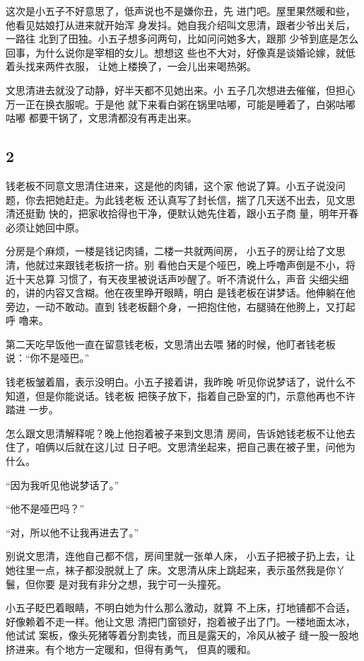 这次是小五子不好意思了，低声说也不是嫌你丑，先
进门吧。屋里果然暖和些，他看见姑娘打从进来就开始浑
身发抖。她自我介绍叫文思清，跟者少爷出关后，一路往
北到了田独。小五子想多问两句，比如问问她多大，跟那
少爷到底是怎么回事，为什么说你是宰相的女儿。想想这
些也不大对，好像真是谈婚论嫁，就低着头找来两件衣服，
让她上楼换了，一会儿出来喝热粥。

文思清进去就没了动静，好半天都不见她出来。小
五子几次想进去催催，但担心万一正在换衣服呢。于是他
就下来看白粥在锅里咕嘟，可能是睡着了，白粥咕嘟咕嘟
都要干锅了，文思清都没有再走出来。
\newline

{\centering\subsection{2}}

钱老板不同意文思清住进来，这是他的肉铺，这个家
他说了算。小五子说没问题，你去把她赶走。为此钱老板
还认真写了封长信，揣了几天送不出去，见文思清还挺勤
快的，把家收拾得也干净，便默认她先住着，跟小五子商
量，明年开春必须让她回中原。

分房是个麻烦，一楼是钱记肉铺，二楼一共就两间房，
小五子的房让给了文思清，他就过来跟钱老板挤一挤。别
看他白天是个哑巴，晚上呼噜声倒是不小，将近十天总算
习惯了，有天夜里被说话声吵醒了。听不清说什么，声音
尖细尖细的，讲的内容又含糊。他在夜里睁开眼睛，明白
是钱老板在讲梦话。他伸躺在他旁边，一动不敢动。直到
钱老板翻个身，一把抱住他，右腿骑在他胯上，又打起呼
噜来。

第二天吃早饭他一直在留意钱老板，文思清出去喂
猪的时候，他盯者钱老板说：“你不是哑巴。”

钱老板皱着眉，表示没明白。小五子接着讲，我昨晚
听见你说梦话了，说什么不知道，但是你能说话。钱老板
把筷子放下，指着自己卧室的门，示意他再也不许踏进
一步。

怎么跟文思清解释呢？晚上他抱着被子来到文思清
房间，告诉她钱老板不让他去住了，咱俩以后就在这儿过
日子吧。文思清坐起来，把自己裹在被子里，问他为什么。

“因为我听见他说梦话了。”

“他不是哑巴吗？”

“对，所以他不让我再进去了。”

别说文思清，连他自己都不信，房间里就一张单人床，
小五子把被子扔上去，让她往里一点，袜子都没脱就上了
床。文思清从床上跳起来，表示虽然我是你丫鬟，但你要
是对我有非分之想，我宁可一头撞死。

小五子眨巴着眼睛，不明白她为什么那么激动，就算
不上床，打地铺都不合适，好像赖着不走一样。他让文思
清把门窗锁好，抱着被子出了门。一楼地面太冰，他试试
案板，像头死猪等着分割卖钱，而且是露天的，冷风从被子
缝一股一股地挤进来。有个地方一定暖和，但得有勇气，
但真的暖和。

